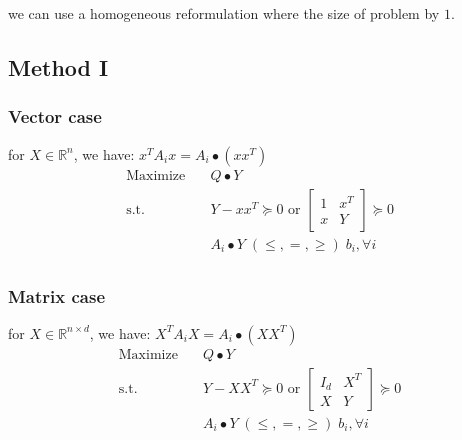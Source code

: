 \documentclass[../main]{subfiles}
\begin{document}
we can use a homogeneous reformulation where the size of problem by $1$.


\subsection{Method I}\label{shor}

\subsubsection{Vector case}
for \(X \in \mathbb{R}^{n}\), we have: \(x^{T} A_{i} x = A_i \bullet (xx^T)\)
\begin{equation}
  \begin{aligned}
    \mathrm{Maximize}\quad & Q\bullet Y                                                        \\
    \mathrm{s.t.}  \quad   & Y-xx^T \succeq 0 \text { or } \begin{bmatrix} 1 & x^{T} \\ x & Y \end{bmatrix} \succeq 0 \\
                           & A_i \bullet Y \; (\le, =, \ge) \; b_i, \forall i                  \\
  \end{aligned}
\end{equation}

\subsubsection{Matrix case}
for \(X \in \mathbb{R}^{n\times d}\), we have: \(X^{T} A_{i} X = A_i \bullet (XX^T)\)
\begin{equation}
  \begin{aligned}
    \mathrm{Maximize}\quad & Q\bullet Y                                                       \\
    \mathrm{s.t.}  \quad   & Y-XX^T \succeq 0 \text { or }\begin{bmatrix} I_d & X^{T} \\ X & Y \end{bmatrix} \succeq 0 \\
                           & A_i \bullet Y \; (\le, =, \ge) \; b_i, \forall i                 \\
  \end{aligned}
\end{equation}
\end{document}
